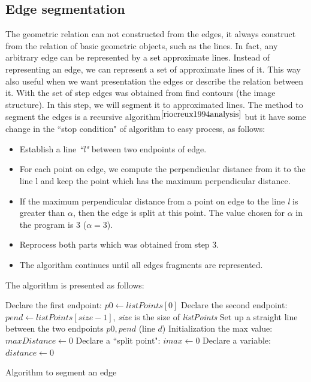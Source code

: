 \subsection{Edge segmentation}
The geometric relation can not constructed from the edges, it always construct from the relation of basic geometric objects, such as the lines.  In fact, any arbitrary edge can be represented by a set approximate lines. Instead of representing an edge, we can represent a set of approximate lines of it. This way also useful when we want presentation the edges or describe the relation between it. With the set of step edges was obtained from find contours (the image structure). In this step, we will segment it to approximated lines. The method to segment the edges is a recursive algorithm$^{\cite{riocreux1994analysis}}$ but it have some change in the ``stop condition" of algorithm to easy process, as follows:
\begin{itemize}
\item Establish a line \textit{``l"} between two endpoints of edge.
\item For each point on edge, we compute the perpendicular distance from it to the line l and keep the point which has the maximum perpendicular distance.
\item If the maximum perpendicular distance from a point on edge to the line \textit{l} is greater than $\alpha$, then the edge is split at this point. The value chosen for $\alpha$ in the program is 3 ($\alpha = 3$).
\item Reprocess both parts which was obtained from step 3.
\item The algorithm continues until all edges fragments are represented.
\end{itemize}
The algorithm is presented as follows:\\
\IncMargin{1em}
\begin{algorithm}[H]
\Indm 
{}
\Indp
Declare the first endpoint: $p0 \leftarrow listPoints[0]$\;
Declare the second endpoint: $pend \leftarrow listPoints[size - 1]$, \textit{size} is the size of \textit{listPoints}\;
Set up a straight line between the two endpoints $p0, pend$ (line $d$)\;
Initialization the max value: $maxDistance  \leftarrow 0 $\;
Declare a ``split point": $imax \leftarrow 0$ \; 
Declare a variable: $distance \leftarrow 0$\;

\caption{Algorithm to segment an edge}
\end{algorithm}\DecMargin{1em}
